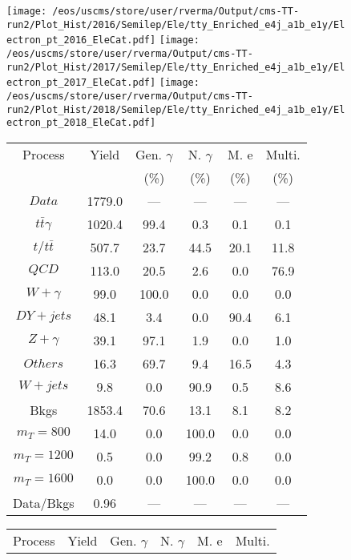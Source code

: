 \begin{figure}
\centering
\texttt{[image: /eos/uscms/store/user/rverma/Output/cms-TT-run2/Plot\_Hist/2016/Semilep/Ele/tty\_Enriched\_e4j\_a1b\_e1y/Electron\_pt\_2016\_EleCat.pdf]}
\texttt{[image: /eos/uscms/store/user/rverma/Output/cms-TT-run2/Plot\_Hist/2017/Semilep/Ele/tty\_Enriched\_e4j\_a1b\_e1y/Electron\_pt\_2017\_EleCat.pdf]}
\texttt{[image: /eos/uscms/store/user/rverma/Output/cms-TT-run2/Plot\_Hist/2018/Semilep/Ele/tty\_Enriched\_e4j\_a1b\_e1y/Electron\_pt\_2018\_EleCat.pdf]}
\begin{minipage}[c]{0.32\textwidth}
\centering
\tiny{
\begin{tabular}{cccccc}
\hline
Process & Yield & Gen. $\gamma$ & N. $\gamma$ & M. e & Multi. \\
 &  & (\%) & (\%) & (\%) & (\%)  \\
\hline
                                                                      $ Data $ &  1779.0 &  --- &  --- &  --- &  ---\\
$ t\bar{t}\gamma $ &  1020.4 &  99.4 &  0.3 &  0.1 &  0.1\\
$ t/t\bar{t} $ &  507.7 &  23.7 &  44.5 &  20.1 &  11.8\\
$ QCD $ &  113.0 &  20.5 &  2.6 &  0.0 &  76.9\\
$ W+\gamma $ &  99.0 &  100.0 &  0.0 &  0.0 &  0.0\\
$ DY+jets $ &  48.1 &  3.4 &  0.0 &  90.4 &  6.1\\
$ Z+\gamma $ &  39.1 &  97.1 &  1.9 &  0.0 &  1.0\\
$ Others $ &  16.3 &  69.7 &  9.4 &  16.5 &  4.3\\
$ W+jets $ &  9.8 &  0.0 &  90.9 &  0.5 &  8.6\\
Bkgs &  1853.4 &  70.6 &  13.1 &  8.1 &  8.2\\
$ m_{T} = 800 $ &  14.0 &  0.0 &  100.0 &  0.0 &  0.0\\
$ m_{T} = 1200 $ &  0.5 &  0.0 &  99.2 &  0.8 &  0.0\\
$ m_{T} = 1600 $ &  0.0 &  0.0 &  100.0 &  0.0 &  0.0\\
Data/Bkgs &  0.96 &  --- &  --- &  --- &  ---\\
\hline
\end{tabular}
}
\end{minipage}
\begin{minipage}[c]{0.32\textwidth}
\centering
\tiny{
\begin{tabular}{cccccc}
\hline
Process & Yield & Gen. $\gamma$ & N. $\gamma$ & M. e & Multi. \\

\end{tabular}}
\end{minipage}
\end{figure}
